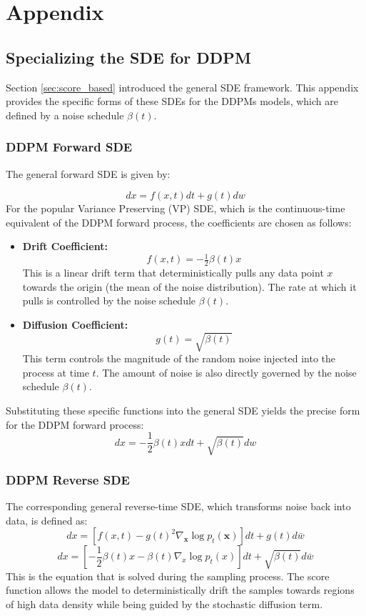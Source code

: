\appendix
\chapter{Appendix}
\label{chap:appendix}

\section{Specializing the SDE for DDPM}
\label{app:sde_ddpm}
Section \ref{sec:score_based} introduced the general SDE framework. This appendix provides the specific forms of these SDEs for the DDPMs models, which are defined by a noise schedule $\beta(t)$.
\subsection{DDPM Forward SDE}
The general forward SDE is given by:

\begin{equation}
	dx=f(x,t)dt+g(t)dw
\end{equation}
For the popular Variance Preserving (VP) SDE, which is the continuous-time equivalent of the DDPM forward process, the coefficients are chosen as follows:
\begin{itemize}
    \item \textbf{Drift Coefficient:} 
    \[
    f(x,t) = -\tfrac{1}{2}\beta(t)x
    \]
    This is a linear drift term that deterministically pulls any data point $x$ towards the origin (the mean of the noise distribution). The rate at which it pulls is controlled by the noise schedule $\beta(t)$.

    \item \textbf{Diffusion Coefficient:}
    \[
    g(t) = \sqrt{\beta(t)}
    \]
    This term controls the magnitude of the random noise injected into the process at time $t$. The amount of noise is also directly governed by the noise schedule $\beta(t)$.
\end{itemize}
Substituting these specific functions into the general SDE yields the precise form for the DDPM forward process:
\begin{equation}
	dx=-\frac{1}{2}\beta(t)xdt+\sqrt{\beta(t)}dw
\end{equation}

\subsection{DDPM Reverse SDE}
The corresponding general reverse-time SDE, which transforms noise back into data, is defined as:
\begin{equation}
	d{x} = \left[f({x}, t) - g(t)^2\nabla_{\mathbf{x}} \log p_t(\mathbf{x})\right] dt + g(t)d\bar{w}
\end{equation}
\begin{equation}
	dx=[-\frac{1}{2}\beta(t)x-\beta(t)\nabla_x\log p_t(x)]dt+\sqrt{\beta(t)}d\bar{w}
\end{equation}
This is the equation that is solved during the sampling process. The score function allows the model to deterministically drift the samples towards regions of high data density while being guided by the stochastic diffusion term.

